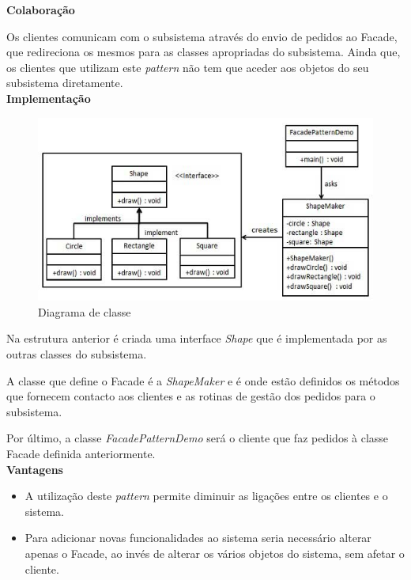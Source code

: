 \textbf{Colaboração}

Os clientes comunicam com o subsistema através do envio de pedidos ao Facade, que redireciona os mesmos para as classes apropriadas do subsistema. Ainda que, os clientes que utilizam este \textit{pattern} não tem que aceder aos objetos do seu subsistema diretamente.\\

\textbf{Implementação}

\begin{figure}[!h]
\centering
\includegraphics[scale=0.7]{img/facade_diagrama}
\caption{Diagrama de classe}
\end{figure}

Na estrutura anterior é criada uma interface \textit{Shape} que é implementada por as outras classes do subsistema.

A classe que define o Facade é a \textit{ShapeMaker} e é onde estão definidos os métodos que fornecem contacto aos clientes e as rotinas de gestão dos pedidos para o subsistema.

Por último, a classe \textit{FacadePatternDemo} será o cliente que faz pedidos à classe Facade definida anteriormente.\\

\textbf{Vantagens}

\begin{itemize}
\item A utilização deste \textit{pattern} permite diminuir as ligações entre os clientes e o sistema.
\item Para adicionar novas funcionalidades ao sistema seria necessário alterar apenas o Facade, ao invés de alterar os vários objetos do sistema, sem afetar o cliente.\\
\end{itemize}





